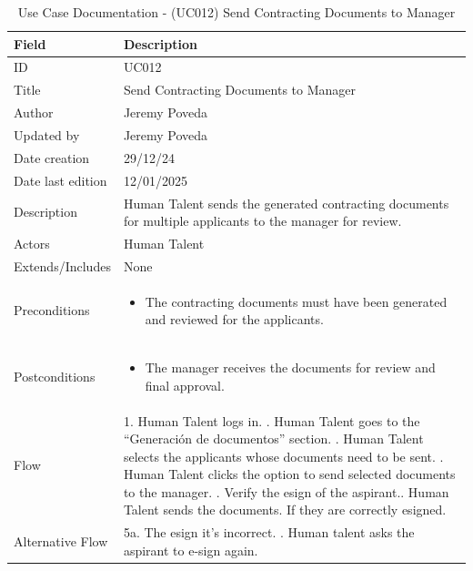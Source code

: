 \documentclass{scrreprt}
\begin{document}
\begin{table}[H]
	\centering
	\begin{tabular}{|p{3cm}|p{10cm}|}
		\hline
		\textbf{Field} & \textbf{Description} \\ \hline
		ID & UC012 \\ \hline
		Title & Send Contracting Documents to Manager \\ \hline
		Author & Jeremy Poveda\\ \hline
		Updated by & Jeremy Poveda \\ \hline
		Date creation & 29/12/24 \\ \hline
		Date last edition & 12/01/2025 \\ \hline
		Description & 
		Human Talent sends the generated contracting documents for multiple applicants to the manager for review. \\ \hline
		Actors & Human Talent \\ \hline
		Extends/Includes & None \\ \hline
		Preconditions & 
		\begin{itemize}
			\item The contracting documents must have been generated and reviewed for the applicants.
		\end{itemize} \\ \hline
		Postconditions & 
		\begin{itemize}
			\item The manager receives the documents for review and final approval.
		\end{itemize} \\ \hline
		Flow & 
		1. Human Talent logs in. \newline
		2. Human Talent goes to the “Generación de documentos” section. \newline
		3. Human Talent selects the applicants whose documents need to be sent. \newline
		4. Human Talent clicks the option to send selected documents to the manager. \newline
		5. Verify the esign of the aspirant.\newline
		6. Human Talent sends the documents. If they are correctly esigned. \\ \hline
		Alternative Flow & 
		5a. The esign it's incorrect. \newline
		1. Human talent asks the aspirant to e-sign again.
		\\ \hline
	\end{tabular}
	\caption{Use Case Documentation - (UC012) Send Contracting Documents to Manager}
	\label{table:UC012}
\end{table}
\end{document}
